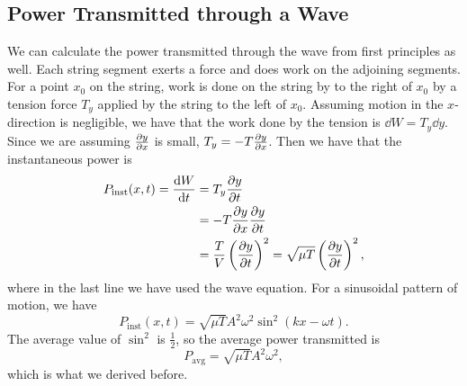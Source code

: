 \documentclass[../classical_mechanics.tex]{subfiles}
\begin{document}
        \subsection{Power Transmitted through a Wave}\label{subsec:power-transmitted-through-a-wave}
            We can calculate the power transmitted through the wave from first principles as well.
            Each string segment exerts a force and does work on the adjoining segments.
            For a point $x_0$ on the string, work is done on the string by to the right of $x_0$ by a tension force $T_y$ applied by the string to the left of $x_0$.
            Assuming motion in the $x$-direction is negligible, we have that the work done by the tension is $\dd{W}=T_y\dd{y}$.
            Since we are assuming $\pdv{y}{x}$ is small, $T_y=-T\pdv{y}{x}$.
            Then we have that the instantaneous power is
            \begin{align}
                P_\text{inst}(x,t)=\dv{W}{t}&=T_y\pdv{y}{t}\\
                &=-T\pdv{y}{x}\pdv{y}{t}\\
                &=\frac{T}{V}\left(\pdv{y}{t}\right)^2=\sqrt{\mu T}\left(\pdv{y}{t}\right)^2,
            \end{align}
            where in the last line we have used the wave equation.
            For a sinusoidal pattern of motion, we have
            \begin{equation}
                P_\text{inst}(x,t)=\sqrt{\mu T}A^2\omega^2\sin^2(kx-\omega t).
            \end{equation}
            The average value of $\sin^2$ is $\frac{1}{2}$, so the average power transmitted is
            \begin{equation}
                P_\text{avg}=\sqrt{\mu T}A^2\omega^2,
            \end{equation}
            which is what we derived before.
\end{document}
